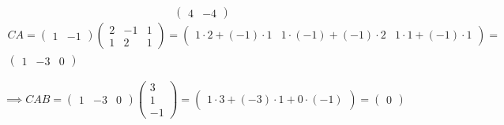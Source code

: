 \documentclass[a4paper, 10pt]{article}
\begin{document}
\begin{solution}
\[\begin{pmatrix}
                4 & -4
            \end{pmatrix}
    \]
    \begin{multline*}
        CA = \begin{pmatrix}
                1 & -1
            \end{pmatrix}\begin{pmatrix}
                2 & -1 & 1 \\
                1 & 2  & 1
            \end{pmatrix} =
        \begin{pmatrix}
                1 \cdot 2 + (-1) \cdot 1 & 1 \cdot (-1) + (-1) \cdot 2 & 1 \cdot 1 + (-1) \cdot 1
            \end{pmatrix} =
        \\
        \begin{pmatrix}
                1 & -3 & 0
            \end{pmatrix}
    \end{multline*}

    \[
        \implies CAB = \begin{pmatrix}
                1 & -3 & 0
            \end{pmatrix} \begin{pmatrix}
                3 \\
                1 \\
                -1
            \end{pmatrix} =
        \begin{pmatrix}
                1 \cdot 3 + (-3) \cdot 1 + 0 \cdot (-1)
            \end{pmatrix} =
        \begin{pmatrix}
                0
            \end{pmatrix}
    \]
\end{solution}
\end{document}
